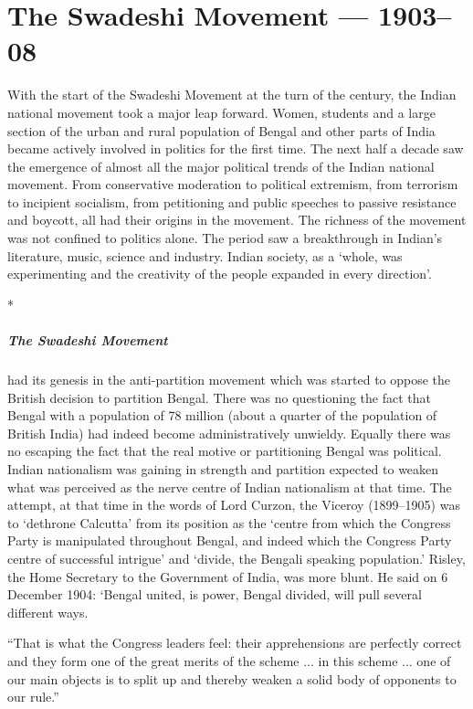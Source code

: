 \chapter{The Swadeshi Movement --- 1903--08}\label{chapter:CH10}

With the start of the Swadeshi Movement at the turn of the century, the Indian national movement took a major leap forward. Women, students and a large section of the urban and rural population of Bengal and other parts of India became actively involved in politics for the first time. The next half a decade saw the emergence of almost all the major political trends of the Indian national movement. From conservative moderation to political extremism, from terrorism to incipient socialism, from petitioning and public speeches to passive resistance and boycott, all had their origins in the movement. The richness of the movement was not confined to politics alone. The period saw a breakthrough in Indian's literature, music, science and industry. Indian society, as a `whole, was experimenting and the creativity of the people expanded in every direction'.

\begin{center}*\end{center}

\paragraph{The Swadeshi Movement} had its genesis in the anti-partition movement which was started to oppose the British decision to partition Bengal. There was no questioning the fact that Bengal with a population of 78 million (about a quarter of the population of British India) had indeed become administratively unwieldy. Equally there was no escaping the fact that the real motive or partitioning Bengal was political. Indian nationalism was gaining in strength and partition expected to weaken what was perceived as the nerve centre of Indian nationalism at that time. The attempt, at that time in the words of Lord Curzon, the Viceroy (1899--1905) was to `dethrone Calcutta' from its position as the `centre from which the Congress Party is manipulated throughout Bengal, and indeed which the Congress Party centre of successful intrigue' and `divide, the Bengali speaking population.' Risley, the Home Secretary to the Government of India, was more blunt. He said on 6 December 1904: `Bengal united, is power, Bengal divided, will pull several different ways.

``That is what the Congress leaders feel: their apprehensions are perfectly correct and they form one of the great merits of the scheme ... in this scheme ... one of our main objects is to split up and thereby weaken a solid body of opponents to our rule.''

